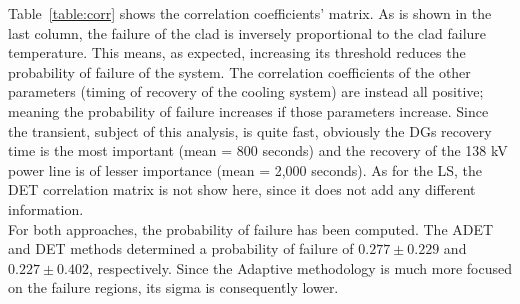 Table~\ref{table:corr} shows the correlation coefficients' matrix.  As is shown in  the last column, the failure of the clad is inversely proportional to the clad failure temperature. This means, as expected, increasing its threshold reduces the probability of failure of the system. The correlation coefficients of the other parameters (timing of recovery of the cooling system) are instead all positive; meaning the probability of failure increases if those parameters increase. Since the transient, subject of this analysis, is quite fast, obviously the DGs recovery time is the most important (mean = 800 seconds) and the recovery of the 138 kV power line is of lesser importance (mean = 2,000 seconds). As for the LS, the DET correlation matrix is not show here, since it does not add any different information.
\\ For both approaches, the probability of failure has been computed. The ADET and DET methods determined a probability of failure of $0.277 \pm 0.229$ and $0.227\pm 0.402$, respectively. Since the Adaptive methodology is much more focused on the failure regions, its sigma is consequently lower.


